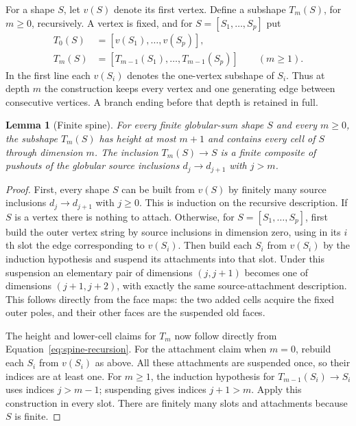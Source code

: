 \documentclass[11pt,letterpaper]{article}
\numberwithin{equation}{section}
\theoremstyle{plain}
\newtheorem{lemma}[theorem]{Lemma}
\theoremstyle{definition}
\theoremstyle{remark}
\begin{document}
For a shape $S$, let $v(S)$ denote its first vertex.  Define a
subshape $T_m(S)$, for $m\geq0$, recursively.  A vertex is fixed, and
for $S=[S_1,\ldots,S_p]$ put
\begin{equation}\label{eq:spine-recursion}
\begin{split}
 T_0(S)&=[v(S_1),\ldots,v(S_p)],\\
 T_m(S)&=[T_{m-1}(S_1),\ldots,T_{m-1}(S_p)]\qquad(m\geq1).
\end{split}
\end{equation}
In the first line each $v(S_i)$ denotes the one-vertex subshape of
$S_i$.  Thus at depth $m$ the construction keeps every vertex and
one generating edge between consecutive vertices.  A branch ending
before that depth is retained in full.

\begin{lemma}[Finite spine]\label{lem:spine}
For every finite globular-sum shape $S$ and every $m\geq0$, the
subshape $T_m(S)$ has height at most $m+1$ and contains every cell of
$S$ through dimension $m$.  The inclusion $T_m(S)\to S$ is a finite
composite of pushouts of the globular source inclusions
$d_j\to d_{j+1}$ with $j>m$.
\end{lemma}

\begin{proof}
First, every shape $S$ can be built from $v(S)$ by finitely many
source inclusions $d_j\to d_{j+1}$ with $j\geq0$.  This is induction
on the recursive description.  If $S$ is a vertex there is nothing
to attach.  Otherwise, for $S=[S_1,\ldots,S_p]$, first build the
outer vertex string by source inclusions in dimension zero, using
in its $i$th slot the edge corresponding to $v(S_i)$.  Then build
each $S_i$ from $v(S_i)$ by the induction hypothesis and suspend its
attachments into that slot.  Under this suspension an elementary
pair of dimensions $(j,j+1)$ becomes one of dimensions $(j+1,j+2)$,
with exactly the same source-attachment description.  This follows
directly from the face maps: the two added cells acquire the fixed
outer poles, and their other faces are the suspended old faces.

The height and lower-cell claims for $T_m$ now follow directly from
Equation~\eqref{eq:spine-recursion}.  For the attachment claim when
$m=0$, rebuild each $S_i$ from $v(S_i)$ as above.  All these
attachments are suspended once, so their indices are at least
one.  For $m\geq1$, the induction hypothesis for
$T_{m-1}(S_i)\to S_i$ uses indices $j>m-1$; suspending gives indices
$j+1>m$.  Apply this construction in every slot.  There are finitely
many slots and attachments because $S$ is finite.
\end{proof}
\end{document}
